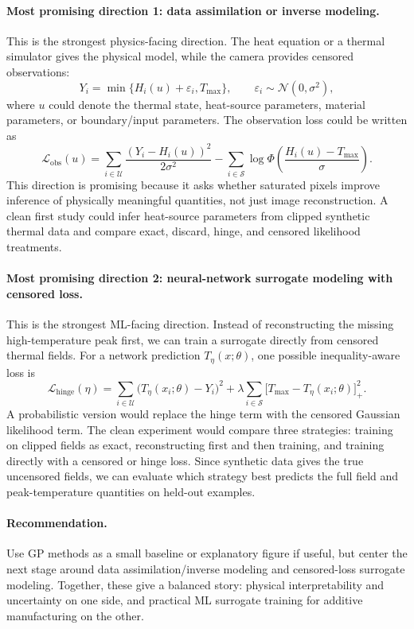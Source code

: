 \paragraph{Most promising direction 1: data assimilation or inverse modeling.}
This is the strongest physics-facing direction. The heat equation or a thermal simulator gives the physical model, while the camera provides censored observations:
\[
    Y_i = \min\{H_i(u) + \varepsilon_i, T_{\max}\},
    \qquad
    \varepsilon_i \sim \mathcal N(0,\sigma^2),
\]
where $u$ could denote the thermal state, heat-source parameters, material parameters, or boundary/input parameters. The observation loss could be written as
\[
    \mathcal L_{\mathrm{obs}}(u)
    =
    \sum_{i\in\mathcal U}
    \frac{(Y_i-H_i(u))^2}{2\sigma^2}
    -
    \sum_{i\in\mathcal S}
    \log \Phi\!\left(\frac{H_i(u)-T_{\max}}{\sigma}\right).
\]
This direction is promising because it asks whether saturated pixels improve inference of physically meaningful quantities, not just image reconstruction. A clean first study could infer heat-source parameters from clipped synthetic thermal data and compare exact, discard, hinge, and censored likelihood treatments.

\paragraph{Most promising direction 2: neural-network surrogate modeling with censored loss.}
This is the strongest ML-facing direction. Instead of reconstructing the missing high-temperature peak first, we can train a surrogate directly from censored thermal fields. For a network prediction $T_\eta(x;\theta)$, one possible inequality-aware loss is
\[
    \mathcal L_{\mathrm{hinge}}(\eta)
    =
    \sum_{i\in\mathcal U}
    \bigl(T_\eta(x_i;\theta)-Y_i\bigr)^2
    +
    \lambda
    \sum_{i\in\mathcal S}
    \bigl[T_{\max}-T_\eta(x_i;\theta)\bigr]_+^2.
\]
A probabilistic version would replace the hinge term with the censored Gaussian likelihood term. The clean experiment would compare three strategies: training on clipped fields as exact, reconstructing first and then training, and training directly with a censored or hinge loss. Since synthetic data gives the true uncensored fields, we can evaluate which strategy best predicts the full field and peak-temperature quantities on held-out examples.

\paragraph{Recommendation.}
Use GP methods as a small baseline or explanatory figure if useful, but center the next stage around data assimilation/inverse modeling and censored-loss surrogate modeling. Together, these give a balanced story: physical interpretability and uncertainty on one side, and practical ML surrogate training for additive manufacturing on the other.

